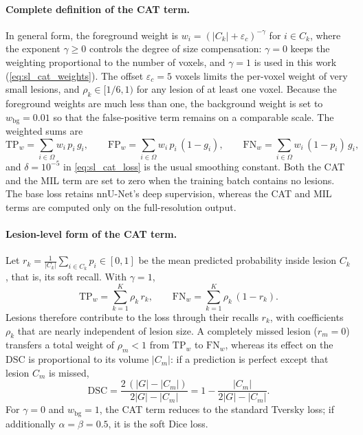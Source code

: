 \paragraph{Complete definition of the CAT term.}
In general form, the foreground weight is
$w_i = (|C_k| + \varepsilon_{c})^{-\gamma}$ for $i \in C_k$, where the
exponent $\gamma \geq 0$ controls the degree of size compensation:
$\gamma=0$ keeps the weighting proportional to the number of voxels, and
$\gamma=1$ is used in this work (\cref{eq:sl_cat_weights}). The offset
$\varepsilon_{c}=5$ voxels limits the per-voxel weight of very small lesions,
and $\rho_k \in [1/6, 1)$ for any lesion of at least one voxel. Because the foreground weights are much
less than one, the background weight is set to $w_{\mathrm{bg}}=0.01$ so
that the false-positive term remains on a comparable scale. The weighted
sums are
\begin{equation}
\mathrm{TP}_{w} = \sum_{i \in \Omega} w_i\, p_i\, g_i,
\qquad
\mathrm{FP}_{w} = \sum_{i \in \Omega} w_i\, p_i\, (1-g_i),
\qquad
\mathrm{FN}_{w} = \sum_{i \in \Omega} w_i\, (1-p_i)\, g_i ,
\end{equation}
and $\delta=10^{-5}$ in \cref{eq:sl_cat_loss} is the usual smoothing
constant. Both the CAT and the MIL term are set to zero when the training
batch contains no lesions. The base loss retains nnU-Net's deep
supervision, whereas the CAT and MIL terms are computed only on the
full-resolution output.

\paragraph{Lesion-level form of the CAT term.}
Let $r_k = \frac{1}{|C_k|}\sum_{i \in C_k} p_i \in [0,1]$ be the mean
predicted probability inside lesion $C_k$, that is, its soft recall. With
$\gamma=1$,
\begin{equation}
\mathrm{TP}_{w} = \sum_{k=1}^{K} \rho_k\, r_k,
\qquad
\mathrm{FN}_{w} = \sum_{k=1}^{K} \rho_k\, (1-r_k) .
\label{eq:sl_cat_lesion_form}
\end{equation}
Lesions therefore contribute to the loss through their recalls $r_k$, with
coefficients $\rho_k$ that are nearly independent of lesion size. A
completely missed lesion ($r_m=0$) transfers a total weight of
$\rho_m < 1$ from $\mathrm{TP}_{w}$ to $\mathrm{FN}_{w}$, whereas its
effect on the DSC is proportional to its volume $|C_m|$: if a prediction is
perfect except that lesion $C_m$ is missed,
\begin{equation}
\mathrm{DSC}
=
\frac{2\,(|G| - |C_m|)}{2|G| - |C_m|}
=
1 - \frac{|C_m|}{2|G| - |C_m|} .
\label{eq:sl_missed_lesion}
\end{equation}
For $\gamma=0$ and $w_{\mathrm{bg}}=1$, the CAT term reduces to the
standard Tversky loss; if additionally $\alpha=\beta=0.5$, it is the soft
Dice loss.

